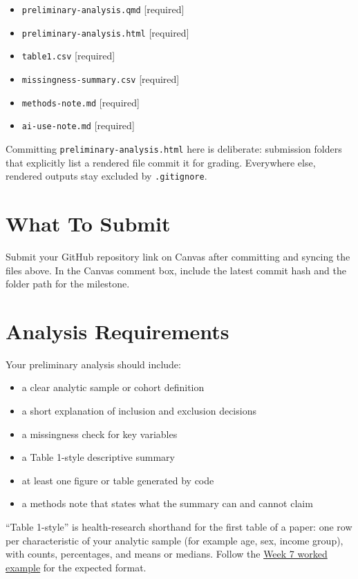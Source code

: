 \documentclass[
  letterpaper,
  DIV=11,
  numbers=noendperiod,
  oneside]{scrreprt}
\providecommand{\tightlist}{%
  \setlength{\itemsep}{0pt}\setlength{\parskip}{0pt}}
\begin{document}
\begin{itemize}
\tightlist
\item
  \texttt{preliminary-analysis.qmd} {[}required{]}
\item
  \texttt{preliminary-analysis.html} {[}required{]}
\item
  \texttt{table1.csv} {[}required{]}
\item
  \texttt{missingness-summary.csv} {[}required{]}
\item
  \texttt{methods-note.md} {[}required{]}
\item
  \texttt{ai-use-note.md} {[}required{]}
\end{itemize}

Committing \texttt{preliminary-analysis.html} here is deliberate:
submission folders that explicitly list a rendered file commit it for
grading. Everywhere else, rendered outputs stay excluded by
\texttt{.gitignore}.

\section{What To Submit}\label{what-to-submit-12}

Submit your GitHub repository link on Canvas after committing and
syncing the files above. In the Canvas comment box, include the latest
commit hash and the folder path for the milestone.

\section{Analysis Requirements}\label{analysis-requirements}

Your preliminary analysis should include:

\begin{itemize}
\tightlist
\item
  a clear analytic sample or cohort definition
\item
  a short explanation of inclusion and exclusion decisions
\item
  a missingness check for key variables
\item
  a Table 1-style descriptive summary
\item
  at least one figure or table generated by code
\item
  a methods note that states what the summary can and cannot claim
\end{itemize}

``Table 1-style'' is health-research shorthand for the first table of a
paper: one row per characteristic of your analytic sample (for example
age, sex, income group), with counts, percentages, and means or medians.
Follow the \hyperref[worked-example-eda-and-table-1]{Week 7 worked
example} for the expected format.
\end{document}

